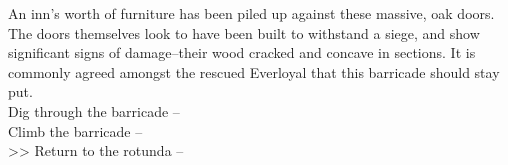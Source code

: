 An inn’s worth of furniture has been piled up against these massive, oak doors. The doors themselves look to have been built to withstand a siege, and show significant signs of damage--their wood cracked and concave in sections. It is commonly agreed amongst the rescued Everloyal that this barricade should stay put.\\

 Dig through the barricade -- \\
 Climb the barricade -- \\
>> Return to the rotunda -- 